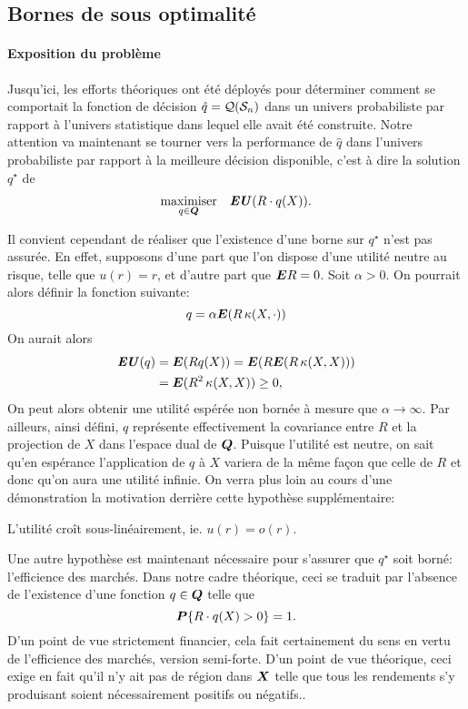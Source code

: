\subsection{Bornes de sous optimalité}
\label{b:sopt}


\paragraph{Exposition du problème}

Jusqu'ici, les efforts théoriques ont été déployés pour déterminer comment se comportait
la fonction de décision $\hat q = \alg(\S_n)$ dans un univers probabiliste par rapport à
l'univers statistique dans lequel elle avait été construite. Notre attention va maintenant
se tourner vers la performance de $\hat q$ dans l'univers probabiliste par rapport à la
meilleure décision disponible, c'est à dire la solution $q^\star$ de 
\begin{equation}
  \maximizeEquation[q \in \Q]{\EU(R \cdot q(X)).}
\end{equation}

Il convient cependant de réaliser que l'existence d'une borne sur $q^\star$ n'est pas
assurée. En effet, supposons d'une part que l'on dispose d'une utilité neutre au risque,
telle que $u(r) = r$, et d'autre part que $\E R=0$. Soit $\alpha>0$. On pourrait alors définir
la fonction suivante:
\begin{equation}
  q = \alpha\E(R\,\kappa(X,\cdot))
\end{equation}
On aurait alors
\begin{align}
  \EU(q) &= \E(R q(X)) = \E(R\E(R\,\kappa(X,X)))\\
         &= \E(R^2\,\kappa(X,X)) \geq 0,
\end{align}
On peut alors obtenir une utilité espérée non bornée à mesure que $\alpha\to\infty$. Par ailleurs,
ainsi défini, $q$ représente effectivement la covariance entre $R$ et la projection de $X$
dans l'espace dual de $\Q$. Puisque l'utilité est neutre, on sait qu'en espérance
l'application de $q$ à $X$ variera de la même façon que celle de $R$ et donc qu'on aura
une utilité infinie. On verra plus loin au cours d'une démonstration la motivation
derrière cette hypothèse supplémentaire:
\begin{assumption}
  L'utilité croît sous-linéairement, ie. $u(r) = o(r)$. 
\end{assumption}

Une autre hypothèse est maintenant nécessaire pour s'assurer que $q^\star$ soit borné:
l'efficience des marchés. Dans notre cadre théorique, ceci se traduit par l'absence de
l'existence d'une fonction $q \in \Q$ telle que
\begin{equation}
  \pp\{R\cdot q(X) > 0\} = 1.
\end{equation}
D'un point de vue strictement financier, cela fait certainement du sens en vertu de
l'efficience des marchés, version semi-forte\cit. D'un point de vue théorique, ceci exige
en fait qu'il n'y ait pas de région dans $\X$ telle que tous les rendements s'y produisant
soient nécessairement positifs ou négatifs..

